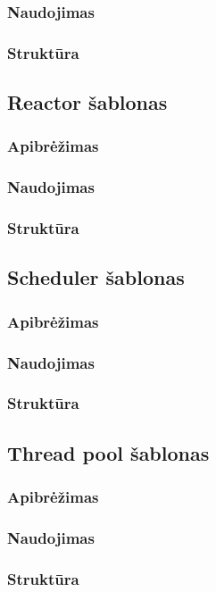 \documentclass[10pt]{IEEEtran}
\begin{document}
			\subsubsection{Naudojimas}

			\subsubsection{Struktūra}

		\subsection{Reactor šablonas}

			\subsubsection{Apibrėžimas}

			\subsubsection{Naudojimas}

			\subsubsection{Struktūra}

		\subsection{Scheduler šablonas}

			\subsubsection{Apibrėžimas}

			\subsubsection{Naudojimas}

			\subsubsection{Struktūra}

		\subsection{Thread pool šablonas}

			\subsubsection{Apibrėžimas}

			\subsubsection{Naudojimas}

			\subsubsection{Struktūra}
\end{document}
